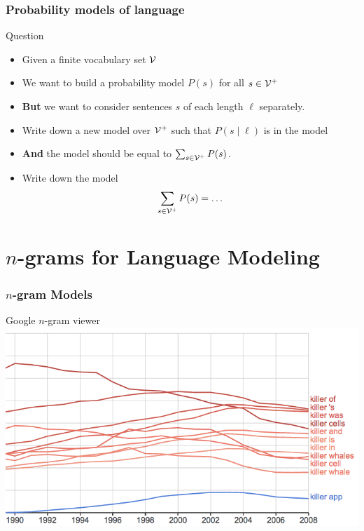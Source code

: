\begin{frame}
\frametitle{Probability models of language}
\centering
\begin{alertblock}{Question}
\begin{itemize}[<+->]
\item Given a finite vocabulary set ${\cal V}$
\item We want to build a probability model $P(s)$ for all $s \in {\cal V}^+$
\item \textbf{But} we want to consider sentences $s$ of each length $\ell$ separately.
\item Write down a new model over ${\cal V}^+$ such that $P(s \mid \ell)$ is in the model 
\item \textbf{And} the model should be equal to $\sum_{s \in {\cal V}^+} P(s)$.
\item Write down the model
\[ \sum_{s \in {\cal V}^+} P(s) = \ldots \]
\end{itemize}
\end{alertblock}
\end{frame}

\section{$n$-grams for Language Modeling}
\frame{\tableofcontents[currentsection]}

\begin{frame}
\frametitle{$n$-gram Models}
\centering
\begin{block}{Google $n$-gram viewer}
\includegraphics[scale=0.45]{figures/killer-ngrams.png}
\end{block}
\end{frame}

